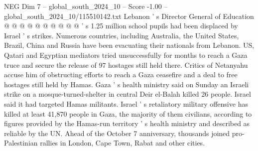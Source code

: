 \begin{textsample}{NEG Dim 7 – global\_south\_2024\_10 – Score -1.00 – global\_south\_2024\_10/115510142.txt}
Lebanon ' s Director General of Education @ @ @ @ @ @ @ @ @ @ ' s 1.25 million school pupils had been displaced by Israel ' s strikes.
Numerous countries, including Australia, the United States, Brazil, China and Russia have been evacuating their nationals from Lebanon.
US, Qatari and Egyptian mediators tried unsuccessfully for months to reach a Gaza truce and secure the release of 97 hostages still held there.
Critics of Netanyahu accuse him of obstructing efforts to reach a Gaza ceasefire and a deal to free hostages still held by Hamas.
Gaza ' s health ministry said on Sunday an Israeli strike on a mosque-turned-shelter in central Deir el-Balah killed 26 people.
Israel said it had targeted Hamas militants.
Israel ' s retaliatory military offensive has killed at least 41,870 people in Gaza, the majority of them civilians, according to figures provided by the Hamas-run territory ' s health ministry and described as reliable by the UN.
Ahead of the October 7 anniversary, thousands joined pro-Palestinian rallies in London, Cape Town, Rabat and other cities.

\end{textsample}
